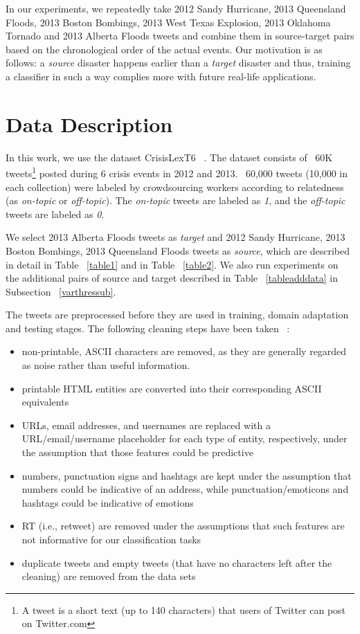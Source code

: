 In our experiments, we repeatedly take 2012 Sandy Hurricane, 2013 Queensland Floods, 2013 Boston Bombings, 2013 West Texas Explosion, 2013 Oklahoma Tornado and 2013 Alberta Floods tweets and combine them in source-target pairs based on the chronological order of the actual events. Our motivation is as follows: a \textit{source} disaster happens earlier than a \textit{target} disaster and thus, training a classifier in such a way complies more with future real-life applications.


\section{Data Description}
\label{dataset}

In this work, we use the dataset CrisisLexT6 ~\citep{data}. The dataset consists of ~60K tweets\footnote{A tweet is a short text (up to 140 characters) that users of Twitter can post on Twitter.com} posted during 6 crisis events in 2012 and 2013.  ~60,000 tweets (10,000 in each collection) were labeled by crowdsourcing workers according to relatedness (as \textit{on-topic} or \textit{off-topic}). The \textit{on-topic} tweets are labeled as \textit{1}, and the \textit{off-topic} tweets are labeled as \textit{0}. 

We select 2013 Alberta Floods tweets as \textit{target} and 2012 Sandy Hurricane, 2013 Boston Bombings, 2013 Queensland Floods tweets as \textit{source}, which are described in detail in Table ~\ref{table1} and in Table ~\ref{table2}. We also run experiments on the additional pairs of source and target described in Table ~\ref{tableadddata} in Subsection ~\ref{varthressub}.

The tweets are preprocessed before they are used in training, domain adaptation and testing stages.
The following cleaning steps have been taken ~\citep{twitterda}:

\begin{itemize}
  \item non-printable, ASCII characters are removed, as they are generally regarded as noise rather than useful information.
  \item printable HTML entities are converted into their corresponding ASCII equivalents
  \item URLs, email addresses, and usernames are replaced with a URL/email/username placeholder for each type of entity, respectively, under the assumption that those features could be predictive 
  \item numbers, punctuation signs and hashtags are kept under the assumption that numbers could be indicative of an address, while punctuation/emoticons and hashtags could be indicative of emotions 
  \item RT (i.e., retweet) are removed under the assumptions that such features are not informative for our classification tasks
  \item duplicate tweets and empty tweets (that have no characters left after the cleaning) are removed from the data sets
\end{itemize}

